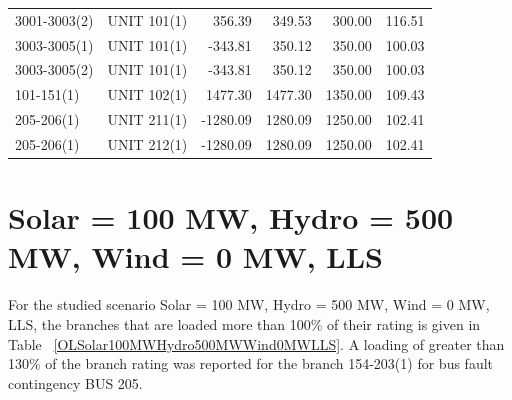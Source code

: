\documentclass[10pt]{report}
\begin{document}
\begin{table}[H]
{\begin{tabular}{llrrrr}
3001-3003(2) & UNIT 101(1) & 356.39 & 349.53 & 300.00 & 116.51 \\
3003-3005(1) & UNIT 101(1) & -343.81 & 350.12 & 350.00 & 100.03 \\
3003-3005(2) & UNIT 101(1) & -343.81 & 350.12 & 350.00 & 100.03 \\
101-151(1) & UNIT 102(1) & 1477.30 & 1477.30 & 1350.00 & 109.43 \\
205-206(1) & UNIT 211(1) & -1280.09 & 1280.09 & 1250.00 & 102.41 \\
205-206(1) & UNIT 212(1) & -1280.09 & 1280.09 & 1250.00 & 102.41 \\
\bottomrule
\end{tabular}}
\end{table}

\section{Solar = 100 MW, Hydro = 500 MW, Wind = 0 MW, LLS}
For the studied scenario Solar = 100 MW, Hydro = 500 MW, Wind = 0 MW, LLS, the branches that are loaded more than 100\% of their rating is given in Table ~\ref{OLSolar100MWHydro500MWWind0MWLLS}. A loading of greater than 130\% of the branch rating was reported for the branch 154-203(1) for bus fault contingency BUS 205.
\begin{table}[H]
\caption{Contingencies causing branch flow greater than 100\% for scenario Solar = 100 MW, Hydro = 500 MW, Wind = 0 MW, LLS}
\label{OLSolar100MWHydro500MWWind0MWLLS}
\centering
{}
\end{table}
\end{document}
